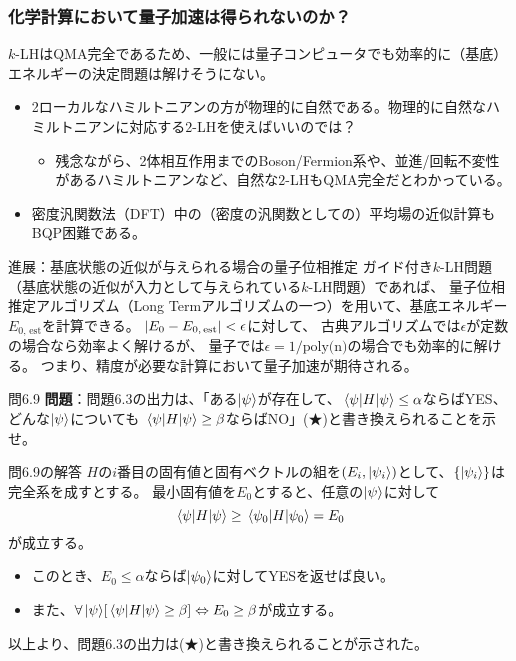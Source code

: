 \documentclass[11pt,aspectratio=169,xcolor=dvipsnames,table,dvipdfmx]{beamer}
\theoremstyle{definition}
\begin{document}
\begin{frame}
  \frametitle{化学計算において量子加速は得られないのか？}
$k$-LHはQMA完全であるため、一般には量子コンピュータでも効率的に（基底）エネルギーの決定問題は解けそうにない。

\begin{itemize}
  \item 2ローカルなハミルトニアンの方が物理的に自然である。物理的に自然なハミルトニアンに対応する$2$-LHを使えばいいのでは？
  \begin{itemize}
    \item 残念ながら、2体相互作用までのBoson/Fermion系や、並進/回転不変性があるハミルトニアンなど、自然な$2$-LHもQMA完全だとわかっている。
  \end{itemize}
  \item 密度汎関数法（DFT）中の（密度の汎関数としての）平均場の近似計算もBQP困難である。
\end{itemize}
  
\begin{exampleblock}{進展：基底状態の近似が与えられる場合の量子位相推定}
  ガイド付き$k$-LH問題（基底状態の近似が入力として与えられている$k$-LH問題）であれば、
  量子位相推定アルゴリズム（Long Termアルゴリズムの一つ）を用いて、基底エネルギー$E_{0,\,\text{est}}$を計算できる。
  $\abs{E_0 - E_{0,\,\text{est}}}<\epsilon$に対して、
  古典アルゴリズムでは$\epsilon$が定数の場合なら効率よく解けるが、
  量子では$\epsilon=1/\text{poly(n)}$の場合でも効率的に解ける。
  つまり、精度が必要な計算において量子加速が期待される。
\end{exampleblock}



\end{frame}

\begin{frame}{問6.9}
  \textbf{問題}：問題6.3の出力は、「ある$\ket{\psi}$が存在して、$\ev{H}{\psi}\leq \alpha$ならばYES、どんな$\ket{\psi}$についても
  $\ev{H}{\psi}\geq \beta$ならばNO」(★)と書き換えられることを示せ。
  \begin{block}{問6.9の解答}
    $H$の$i$番目の固有値と固有ベクトルの組を$(E_i,\ket{\psi_i})$として、$\{\ket{\psi_i}\}$は完全系を成すとする。
    最小固有値を$E_0$とすると、任意の$\ket{\psi}$に対して
    \begin{equation}
      \ev{H}{\psi} \geq \ev{H}{\psi_0} = E_0
    \end{equation}
    が成立する。
    \begin{itemize}
      \item このとき、$E_0\leq \alpha$ならば$\ket{\psi_0}$に対してYESを返せば良い。
      \item また、$\forall\ket{\psi}\!\qty[\ev{H}{\psi}\geq \beta] \Leftrightarrow E_0\geq \beta$が成立する。
    \end{itemize}
    以上より、問題6.3の出力は(★)と書き換えられることが示された。
  \end{block}

\end{frame}
\end{document}

